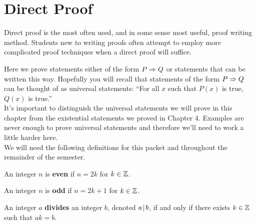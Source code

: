 \chapter{Direct Proof}

Direct proof is the most often used, and in some sense most useful, proof writing method.  Students new to writing proofs often attempt to employ more complicated proof techniques when a direct proof will suffice.

\begin{center}
\end{center}

Here we prove statements either of the form $P \Rightarrow Q$ or statements that can be written this way.  Hopefully you will recall that statements of the form $P \Rightarrow Q$ can be thought of as universal statements: ``For all $x$ such that $P(x)$ is true, $Q(x)$ is true.''\\

It's important to distinguish the universal statements we will prove in this chapter from the existential statements we proved in Chapter 4.  Examples are never enough to prove universal statements and therefore we'll need to work a little harder here.\\

We will need the following definitions for this packet and throughout the remainder of the semester.

\begin{definition}[Even] An integer $n$ is \textbf{even} if $n= 2k$ for $k \in \mathbb{Z}$.
\label{even}
\end{definition}

\begin{definition}[Odd] An integer $n$ is \textbf{odd} if $n=2k+1$ for $k \in \mathbb{Z}$.
\label{odd}
\end{definition}

\begin{definition}[Divides] An integer $a$ \textbf{divides} an integer $b$, denoted $a \! \mid \! b$, if and only if there exists $k \in \mathbb{Z}$ such that $ak=b$.
\label{divides}
\end{definition}


